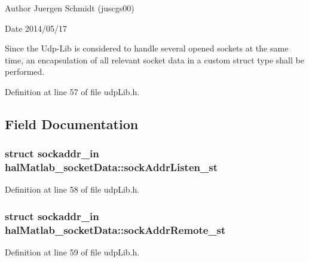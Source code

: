  \begin{DoxyAuthor}{Author}
Juergen Schmidt (juscgs00) 
\end{DoxyAuthor}
\begin{DoxyDate}{Date}
2014/05/17
\end{DoxyDate}
Since the Udp-\/\+Lib is considered to handle several opened sockets at the same time, an encapsulation of all relevant socket data in a custom struct type shall be performed.

Definition at line 57 of file udp\+Lib.\+h.



\subsection{Field Documentation}
\hypertarget{structhalMatlab__socketData_a879fc935cde2c09c6c02cf6e6ecafb86_a879fc935cde2c09c6c02cf6e6ecafb86}{
\subsubsection[{sock\+Addr\+Listen\+\_\+st}]{\setlength{\rightskip}{0pt plus 5cm}struct sockaddr\+\_\+in hal\+Matlab\+\_\+socket\+Data\+::sock\+Addr\+Listen\+\_\+st}}\label{structhalMatlab__socketData_a879fc935cde2c09c6c02cf6e6ecafb86_a879fc935cde2c09c6c02cf6e6ecafb86}


Definition at line 58 of file udp\+Lib.\+h.

\hypertarget{structhalMatlab__socketData_aa9b77c362396cf1fbb78dd9688da4a0d_aa9b77c362396cf1fbb78dd9688da4a0d}{
\subsubsection[{sock\+Addr\+Remote\+\_\+st}]{\setlength{\rightskip}{0pt plus 5cm}struct sockaddr\+\_\+in hal\+Matlab\+\_\+socket\+Data\+::sock\+Addr\+Remote\+\_\+st}}\label{structhalMatlab__socketData_aa9b77c362396cf1fbb78dd9688da4a0d_aa9b77c362396cf1fbb78dd9688da4a0d}


Definition at line 59 of file udp\+Lib.\+h.


